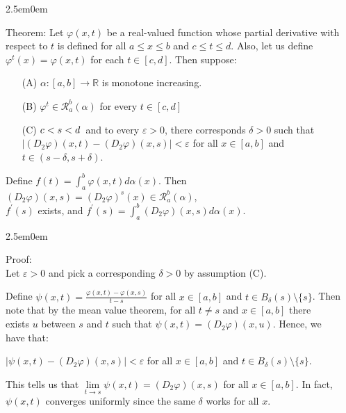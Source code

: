 \documentclass{book}
\newcommand{\hTwo}{%
   \color{MidnightBlue}%
   \fontsize{13}{15}\selectfont%
}
\newcommand{\hThree}{%
   \color{PineGreen!85!Orange}
   \fontsize{13}{15}\selectfont%
}
\newenvironment{myIndent}{%
   \begin{adjustwidth}{2.5em}{0em}%
}{%
   \end{adjustwidth}%
}
\newcommand{\uuline}[2][.]{%
{\vphantom{a}\color{#1}%
\rlap{\rule[-0.18em]{\widthof{#2}}{0.06em}}%
\rlap{\rule[-0.32em]{\widthof{#2}}{0.06em}}}%
#2}
\newcommand{\retTwo}{\hfill\bigbreak}
\begin{document}
{\begin{myIndent}\hTwo
   \uuline{Theorem}: Let $\varphi(x, t)$ be a real-valued function whose partial derivative with\\ respect to $t$ is defined for all $a \leq x \leq b$ and $c \leq t \leq d$. Also, let us define\\ $\varphi^t(x) = \varphi(x, t)$ for each $t \in [c, d]$. Then suppose:
   \begin{itemize}
      \item[(A)] $\alpha: [a, b] \longrightarrow \mathbb{R}$ is monotone increasing.
      \item[(B)] $\varphi^t \in \mathscr{R}_a^b(\alpha)$ for every $t \in [c, d]$
      \item[(C)] $c < s < d\hspace{0.2em}$ and to every $\varepsilon > 0$, there corresponds $\delta > 0$ such that\\ $|(D_2\varphi)(x, t) - (D_2\varphi)(x, s)| < \varepsilon$ for all $x \in [a, b]$ and $t \in (s - \delta, s + \delta)$.\retTwo
   \end{itemize}

   Define $f(t) = \int_a^b \varphi(x, t)d\alpha(x)$. Then $(D_2\varphi)(x, s) = (D_2\varphi)^s(x) \in \mathscr{R}_a^b(\alpha)$,\\ $f^\prime(s)$ exists, and $f^\prime(s) = \int_a^b (D_2\varphi)(x, s)d\alpha(x)$. \retTwo

   {\begin{myIndent}\hThree
      Proof:\\
      Let $\varepsilon > 0$ and pick a corresponding $\delta > 0$ by assumption (C).\retTwo

      Define $\psi(x, t) = \frac{\varphi(x, t) - \varphi(x, s)}{t - s}$ for all $x \in [a, b]$ and $t \in B_\delta(s) \setminus \{s\}$. Then\\ note that by the mean value theorem, for all $t \neq s$ and $x \in [a, b]$ there\\ exists $u$ between $s$ and $t$ such that $\psi(x, t) = (D_2\varphi)(x, u)$. Hence, we\\ have that:

      {\centering $|\psi(x, t) - (D_2\varphi)(x, s)| < \varepsilon$ for all $x \in [a, b]$ and $t \in B_\delta(s) \setminus \{s\}$. \retTwo\par}

      This tells us that $\lim\limits_{t\rightarrow s}\psi(x, t) = (D_2\varphi)(x, s)$ for all $x \in [a, b]$. In fact,\\ [-1pt] $\psi(x, t)$ converges uniformly since the same $\delta$ works for all $x$.\retTwo 
      

\end{myIndent}}
\end{myIndent}}
\end{document}
